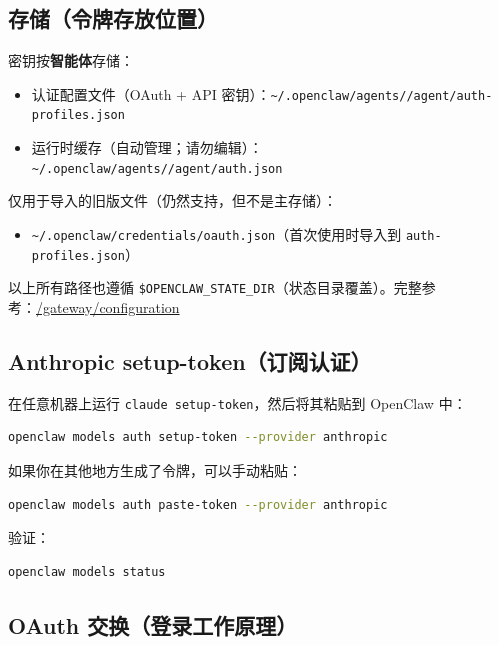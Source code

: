 \subsection{存储（令牌存放位置）}


密钥按\textbf{智能体}存储：

\begin{itemize}
  \item 认证配置文件（OAuth + API 密钥）：\texttt{\textasciitilde{}/.openclaw/agents//agent/auth-profiles.json}
  \item 运行时缓存（自动管理；请勿编辑）：\texttt{\textasciitilde{}/.openclaw/agents//agent/auth.json}
\end{itemize}


仅用于导入的旧版文件（仍然支持，但不是主存储）：

\begin{itemize}
  \item \texttt{\textasciitilde{}/.openclaw/credentials/oauth.json}（首次使用时导入到 \texttt{auth-profiles.json}）
\end{itemize}


以上所有路径也遵循 \texttt{\$OPENCLAW\_STATE\_DIR}（状态目录覆盖）。完整参考：\href{/gateway/configuration\#auth-storage-oauth--api-keys}{/gateway/configuration}

\subsection{Anthropic setup-token（订阅认证）}


在任意机器上运行 \texttt{claude setup-token}，然后将其粘贴到 OpenClaw 中：

\begin{lstlisting}[language=bash]
openclaw models auth setup-token --provider anthropic
\end{lstlisting}


如果你在其他地方生成了令牌，可以手动粘贴：

\begin{lstlisting}[language=bash]
openclaw models auth paste-token --provider anthropic
\end{lstlisting}


验证：

\begin{lstlisting}[language=bash]
openclaw models status
\end{lstlisting}


\subsection{OAuth 交换（登录工作原理）}


